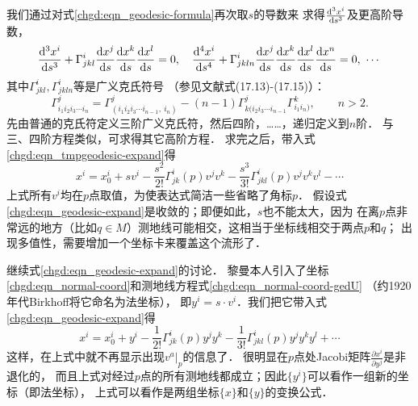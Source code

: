 我们通过对式\eqref{chgd:eqn_geodesic-formula}再次取$s$的导数来
求得$\frac{{\rm d}^3 x^i}{{\rm d} s^3}$及更高阶导数，
\begin{equation}
    \frac{{\rm d}^3 x^i}{{\rm d} s^3}+\Gamma^{i}_{jkl}\frac{{\rm d} x^j}{{\rm d} s}
    \frac{{\rm d} x^k}{{\rm d} s}\frac{{\rm d} x^l}{{\rm d} s} =0 , \quad
    \frac{{\rm d}^4 x^i}{{\rm d} s^4}+\Gamma^{i}_{jkln}\frac{{\rm d} x^j}{{\rm d} s}
    \frac{{\rm d} x^k}{{\rm d} s}\frac{{\rm d} x^l}{{\rm d} s}\frac{{\rm d} x^n}{{\rm d} s} =0,
    \ \cdots
\end{equation}
其中$\Gamma^{i}_{jkl},\Gamma^{i}_{jkln}$等是广义克氏符号
（参见文献\parencite[\S 17]{eisenhart-1997-rg}式(17.13)-(17.15)）：
\begin{equation}\label{chgd:eqn_generalized-Christoffel}
    \Gamma^{j}_{i_1i_2i_3\cdots i_n} =  \Gamma^{j}_{(i_1i_2i_3\cdots i_{n-1},\ i_n)}
    - (n-1) \Gamma^{j}_{k(i_2i_3\cdots i_{n-1}}  \Gamma^{k}_{i_1i_n)},\qquad n>2 .
\end{equation}
先由普通的克氏符定义三阶广义克氏符，然后四阶，……，递归定义到$n$阶．
与三、四阶方程类似，可求得其它高阶方程．
求完之后，带入式\eqref{chgd:eqn_tmpgeodesic-expand}得
\begin{equation}\label{chgd:eqn_geodesic-expand}
    x^i = x^i_0 + s v^i  - \frac{s^2}{2!} \Gamma_{jk}^i(p) v^j v^k
        - \frac{s^3}{3!}  \Gamma^{i}_{jkl}(p) v^j v^k v^l
        - \cdots
\end{equation}
上式所有$v^i$均在$p$点取值，为使表达式简洁一些省略了角标$p$．
假设式\eqref{chgd:eqn_geodesic-expand}是收敛的；即便如此，$s$也不能太大，因为
在离$p$点非常远的地方（比如$q\in M$）测地线可能相交，这相当于坐标线相交于两点$p$和$q$；
出现多值性，需要增加一个坐标卡来覆盖这个流形了．



继续式\eqref{chgd:eqn_geodesic-expand}的讨论．
黎曼本人引入了坐标\eqref{chgd:eqn_normal-coord}和测地线方程式\eqref{chgd:eqn_normal-coord-gedU}
（约1920年代Birkhoff将它命名为法坐标），
即$ y^i = s\cdot v^i$．我们把它带入式\eqref{chgd:eqn_geodesic-expand}得
\begin{equation}
    x^i = x^i_0 + y^i  - \frac{1}{2!} \Gamma_{jk}^i(p) y^j y^k
    - \frac{1}{3!}  \Gamma^{i}_{jkl}(p) y^j y^k y^l + \cdots
\end{equation}
这样，在上式中就不再显示出现$v^a|_p$的信息了．
很明显在$p$点处Jacobi矩阵$\frac{\partial x^i}{\partial y^j}$是非退化的，
而且上式对经过$p$点的所有测地线都成立；因此$\{y^i\}$可以看作一组新的坐标（即法坐标），
上式可以看作是两组坐标$\{x\}$和$\{y\}$的变换公式．

